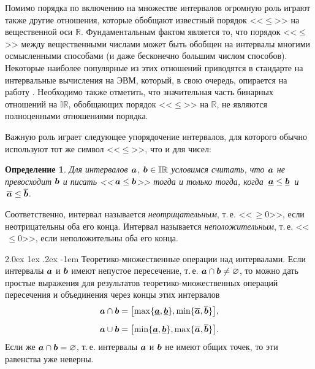 \documentclass[a5paper,openany]{book}
\makeatletter
\newcommand{\mbf}[1]{\protect\text{\boldmath$#1$}}
\newcommand{\mbb}{\mathbb}
\newcommand{\ov}{\overline}
\newcommand{\un}{\underline}
\renewcommand\paragraph{\@startsection{paragraph}{4}{\z@}%
                         {2.0ex \@plus1ex \@minus.2ex}%
                         {-1em}%
                         {\normalfont\normalsize\bfseries}}
\newtheorem{definition}{Определение}[section]
\makeatother
\begin{document}
Помимо порядка по включению на множестве интервалов огромную роль играют также другие 
отношения, которые обобщают известный порядок <<$\leq$>> на вещественной оси $\mbb{R}$. 
Фундаментальным фактом является то, что порядок <<$\leq$>> между вещественными числами 
может быть обобщен на интервалы многими осмысленными способами (и даже бесконечно 
большим числом способов). Некоторые наиболее популярные из этих отношений приводятся 
в стандарте \cite{IEEE-1788} на интервальные вычисления на ЭВМ, который, в свою очередь, 
опирается на работу \cite{Allen}. Необходимо также отметить, что значительная часть 
бинарных отношений на $\mbb{IR}$, обобщающих порядок <<$\leq$>> на $\mbb{R}$, 
не являются полноценными отношениями порядка. 
  
Важную роль играет следующее упорядочение интервалов, для которого обычно используют 
тот же символ <<$\leq$>>, что и для чисел: 
  
\begin{definition} 
Для интервалов $\mbf{a}$, $\mbf{b}\in\mbb{IR}$ условимся считать, что
\textsl{$\mbf{a}$ не превосходит $\mbf{b}$} и писать <<$\,\mbf{a}\leq 
\mbf{b}$>> тогда и только тогда, когда $\,\un{\mbf{a}}\leq\un{\mbf{b}}\,$
и $\,\ov{\mbf{a}}\leq\ov{\mbf{b}}$. 
\end{definition} 
  
Соответственно, интервал называется \textit{неотрицательным}, т.\,е. <<$\,\geq 0$>>, 
если неотрицательны оба его конца. Интервал называется \textit{неположительным}, 
т.\,е. <<$\,\leq 0$>>, если неположительны оба его конца. 

  
    
\paragraph{Теоретико-множественные операции над интервалами.} 
Если интервалы $\mbf{a}$ и $\mbf{b}$ имеют непустое пересечение, т.\,е. $\mbf{a}
\cap \mbf{b} \neq\varnothing$, то можно дать простые выражения для результатов 
теоретико-множественных операций пересечения и объединения через концы этих интервалов 
\begin{align*} 
\mbf{a}\cap\mbf{b} &= 
  \bigl[\max\{\un{\mbf{a}}, \un{\mbf{b}}\}, \min\{\ov{\mbf{a}}, \ov{\mbf{b}}\}\bigr], 
  \\[5pt] 
\mbf{a}\cup\mbf{b} &= 
  \bigl[\min\{\un{\mbf{a}}, \un{\mbf{b}}\}, \max\{\ov{\mbf{a}}, \ov{\mbf{b}}\}\bigr].  
\end{align*} 
Если же $\mbf{a}\cap\mbf{b} = \varnothing$, т.\,е. интервалы $\mbf{a}$ и $\mbf{b}$ 
не имеют общих точек, то эти равенства уже неверны. 
  
\end{document}
